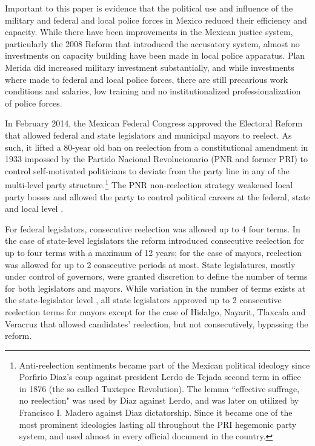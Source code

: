 \documentclass[12pt]{amsart}
\makeatletter
\def\subsection{\@startsection{subsection}{2}
	\z@{.8\linespacing\@plus.7\linespacing}{.7\linespacing}{\large}}
\numberwithin{equation}{section}
\theoremstyle{definition}
\theoremstyle{definition}
\theoremstyle{definition}
\makeatother
\begin{document}
Important to this paper is evidence that the political use and influence of the military \citep{aguayo_2001, moloeznik_2010, lopez_gonzalez_2012} and federal and local police forces in Mexico \citep{zepeda_2010, sabet_2012, lopez_portillo_2012, davis_2017} reduced their efficiency and capacity. While there have been improvements in the Mexican justice system, particularly the 2008 Reform that introduced the accusatory system, almost no investments on capacity building have been made in local police apparatus. Plan Merida did increased military investment substantially, and while investments where made to federal and local police forces, there are still precarious work conditions and salaries, low training and no institutionalized professionalization of police forces. 


\subsection{Term Limit Reform of 2014 \label{sec:reform}}   
       
In February 2014, the Mexican Federal Congress approved the Electoral Reform that allowed federal and state legislators and municipal mayors to reelect. As such, it lifted a 80-year old ban on reelection from a constitutional amendment in 1933 impossed by the Partido Nacional Revolucionario (PNR and former PRI) to control self-motivated politicians to deviate from the party line in any of the multi-level party structure.\footnote{Anti-reelection sentiments became part of the Mexican political ideology since Porfirio Diaz's coup against president Lerdo de Tejada second term in office in 1876 (the so called Tuxtepec Revolution). The lemma ``effective suffrage, no reelection" was used by Diaz against Lerdo, and was later on utilized by Francisco I. Madero against Diaz dictatorship. Since it became one of the most prominent ideologies lasting all throughout the PRI hegemonic party system, and used almost in every official document in the country.} The PNR non-reelection strategy weakened local party bosses and allowed the party to control political careers at the federal, state and local level \citep{weldon_2003}. 

For federal legislators, consecutive reelection was allowed up to 4 four terms. In the case of state-level legislators the reform introduced consecutive reelection for up to four terms with a maximum of 12 years; for the case of mayors, reelection was allowed for up to 2 consecutive periods at most. State legislatures, mostly under control of governors, were granted discretion to define the number of terms for both legislators and mayors. While variation in the number of terms exists at the state-legislator level \citep{motolinia_2020}, all state legislators approved up to 2 consecutive reelection terms for mayors except for the case of Hidalgo, Nayarit, Tlaxcala and Veracruz that allowed candidates' reelection, but not consecutively, bypassing the reform.  
\end{document}
